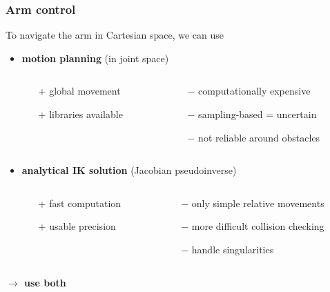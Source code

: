 \documentclass{beamer}
\newcommand*{\mns}{\(-\)}
\begin{document}
\begin{frame}
  \frametitle{Arm control}
  To navigate the arm in Cartesian space, we can use
   \vspace{.3cm}
  \begin{itemize}
  \item \textbf{motion planning} (in joint space)
    \begin{columns}[T]
      \begin{column}{.5\textwidth}
        \begin{itemize}
        \item[+] global movement
        \item[+] libraries available
        \end{itemize}
      \end{column}
      
      \begin{column}{.5\textwidth}
        \begin{itemize}
        \item[\mns] computationally expensive
        \item[\mns] sampling-based = uncertain
        \item[\mns] not reliable around obstacles
        \end{itemize}
      \end{column}
    \end{columns}
  \item \textbf{analytical IK solution} (Jacobian pseudoinverse)
    \begin{columns}[T]
      \begin{column}{.5\textwidth}
        \begin{itemize}
        \item[+] fast computation
        \item[+] usable precision
        \end{itemize}
      \end{column}
      
      \begin{column}{.5\textwidth}
        \begin{itemize}
        \item[\mns] only simple relative movements
        \item[\mns] more difficult collision checking
        \item[\mns] handle singularities
        \end{itemize}
      \end{column}
    \end{columns}
  \end{itemize}
    \textbf{\(\rightarrow\) use both}
\end{frame}
\end{document}
